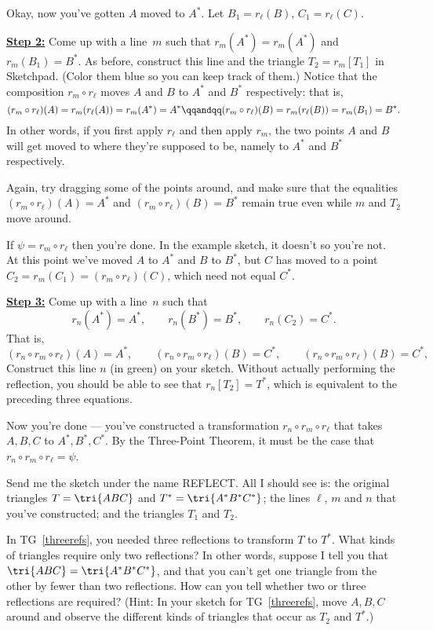 \begin{TG}
Okay, now you've gotten $A$ moved to $A^*$. Let $B_1 = r_\ell(B)$, $C_1 = r_\ell(C)$.

\underline{\bf Step 2:}  Come up with a line~$m$ such that
$r_m(A^*)=r_m(A^*)$ and $r_m(B_1)=B^*$.  As before, construct this line
and the triangle $T_2=r_m[T_1]$ in Sketchpad.  (Color them blue so you can
keep track of them.)  Notice that the composition
$r_m\circ r_\ell$ moves $A$ and $B$ to $A^*$ and $B^*$ respectively: that is,
  $$(r_m\circ r_\ell)(A) = r_m(r_\ell(A)) = r_m(A^*) = A^* \qqandqq
    (r_m\circ r_\ell)(B) = r_m(r_\ell(B)) = r_m(B_1) = B^*.$$
In other words, if you first apply $r_\ell$ and then apply $r_m$, the two points
$A$ and $B$ will get moved to where they're supposed to be, namely to $A^*$ and $B^*$
respectively.

Again, try dragging some of the points around, and make sure that the equalities
$(r_m\circ r_\ell)(A)=A^*$ and $(r_m\circ r_\ell)(B)=B^*$ remain true even while
$m$ and $T_2$ move around.

If $\psi=r_m\circ r_\ell$ then you're done.  In the example sketch,
it doesn't so you're not.  At this point we've moved $A$ to $A^*$ and $B$ to 
$B^*$, but $C$ has moved to a point $C_2=r_m(C_1)=(r_m\circ r_\ell)(C)$, which need not
equal $C^*$.

\underline{\bf Step 3:} Come up with a line~$n$ such that
  $$r_n(A^*)=A^*, \qquad r_n(B^*)=B^*, \qquad r_n(C_2)=C^*.$$
That is,
  $$(r_n\circ r_m\circ r_\ell)(A)=A^*, \qquad
    (r_n\circ r_m\circ r_\ell)(B)=C^*, \qquad
    (r_n\circ r_m\circ r_\ell)(B)=C^*,$$
Construct this line $n$ (in green) on your sketch.  Without actually performing
the reflection, you should be able to see that $r_n[T_2]=T^*$, which is
equivalent to the preceding three equations.

Now you're done --- you've constructed a transformation $r_n\circ r_m\circ r_\ell$
that takes $A,B,C$ to $A^*,B^*,C^*$.  By the Three-Point Theorem,
it must be the case that $r_n\circ r_m\circ r_\ell=\psi$.

Send me the sketch under the name REFLECT.  All I should see is: the original
triangles $T=\tri{ABC}$ and $T^*=\tri{A^*B^*C^*}$; the lines $\ell$, $m$ and
$n$ that you've constructed; and the triangles $T_1$ and $T_2$.
\end{TG}

\bigskip

\begin{TG}
In TG~\ref{threerefs}, you needed three reflections to transform $T$ to $T^*$.  What kinds of triangles
require only two reflections?  In other words, suppose I tell you that
$\tri{ABC}=\tri{A^*B^*C^*}$, and that you can't get one triangle from the other
by fewer than two reflections.  How can you tell whether two or three reflections
are required?  (Hint: In your sketch for TG~\ref{threerefs}, move $A,B,C$ around and observe
the different kinds of triangles that occur as $T_2$ and $T^*$.)
\end{TG}


